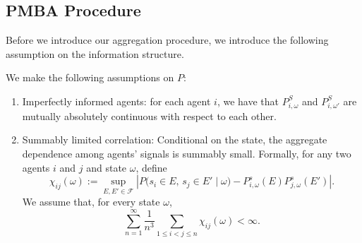 \documentclass[12pt,reqno]{amsart}
\begin{document}
\subsection{PMBA Procedure}\label{sec:infinite}
Before we introduce our aggregation procedure, we introduce the following assumption on the information structure.
\begin{assumption}\label{ass:1}
    We make the following assumptions on $P$:
    \begin{enumerate}
    \item Imperfectly informed agents: for each agent $i$, we have that $P_{i, \omega}^S$ and $P_{i, \omega'}^S$ are mutually absolutely continuous with respect to each other.
    \item Summably limited correlation: Conditional on the state, the aggregate dependence among agents' signals is summably small. Formally, for any two agents $i$ and $j$ and state $\omega$, define \[ \chi_{ij}(\omega) := \sup_{E,E' \in \mathcal{F}} \left| P\bigl(s_i \in E,\,s_j \in E' \mid \omega\bigr) - P^s_{i,\omega}(E)P^s_{j,\omega}(E') \right|. \] We assume that, for every state $\omega$, \[ \sum_{n=1}^{\infty} \frac{1}{n^3} \sum_{1\leq i<j\leq n} \chi_{ij}(\omega) <\infty. \] \end{enumerate}
    \end{assumption}
\end{document}
